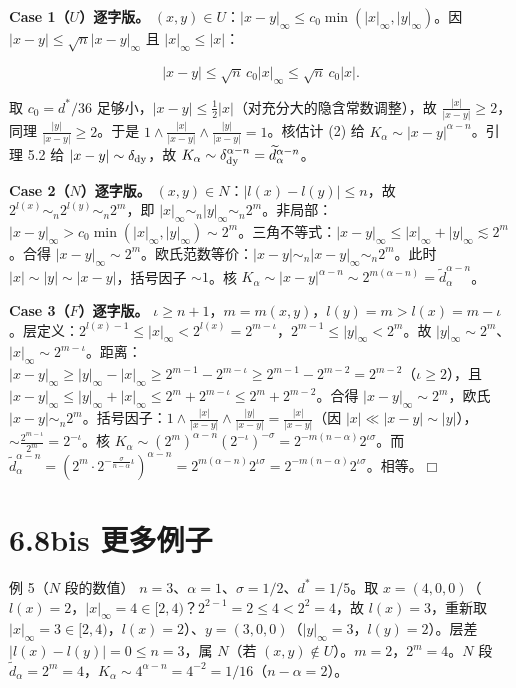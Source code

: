 \documentclass[a4paper,11pt,openany]{ctexbook}
\numberwithin{equation}{chapter}
\numberwithin{figure}{chapter}
\numberwithin{table}{chapter}
\begin{document}
\textbf{Case 1（$U$）逐字版。} $(x,y)\in U$：$|x-y|_\infty\le c_0\min(|x|_\infty,|y|_\infty)$。因 $|x-y|\le\sqrt n|x-y|_\infty$ 且 $|x|_\infty\le|x|$：

$$|x-y|\le\sqrt n\, c_0|x|_\infty\le\sqrt n\, c_0|x|.$$

取 $c_0=d^*/36$ 足够小，$|x-y|\le\frac12|x|$（对充分大的隐含常数调整），故 $\frac{|x|}{|x-y|}\ge2$，同理 $\frac{|y|}{|x-y|}\ge2$。于是 $1\wedge\frac{|x|}{|x-y|}\wedge\frac{|y|}{|x-y|}=1$。核估计 (2) 给 $K_\alpha\sim|x-y|^{\alpha-n}$。引理 5.2 给 $|x-y|\sim\delta_{\rm dy}$，故 $K_\alpha\sim\delta_{\rm dy}^{\alpha-n}=\widetilde d_\alpha^{\alpha-n}$。

\textbf{Case 2（$N$）逐字版。} $(x,y)\in N$：$|l(x)-l(y)|\le n$，故 $2^{l(x)}\sim_n2^{l(y)}\sim_n2^{m}$，即 $|x|_\infty\sim_n|y|_\infty\sim_n2^{m}$。非局部：$|x-y|_\infty>c_0\min(|x|_\infty,|y|_\infty)\sim2^{m}$。三角不等式：$|x-y|_\infty\le|x|_\infty+|y|_\infty\lesssim2^{m}$。合得 $|x-y|_\infty\sim2^{m}$。欧氏范数等价：$|x-y|\sim_n|x-y|_\infty\sim_n2^{m}$。此时 $|x|\sim|y|\sim|x-y|$，括号因子 $\sim1$。核 $K_\alpha\sim|x-y|^{\alpha-n}\sim2^{m(\alpha-n)}=\widetilde d_\alpha^{\alpha-n}$。

\textbf{Case 3（$F$）逐字版。} $\iota\ge n+1$，$m=m(x,y)$，$l(y)=m>l(x)=m-\iota$。层定义：$2^{l(x)-1}\le|x|_\infty<2^{l(x)}=2^{m-\iota}$，$2^{m-1}\le|y|_\infty<2^m$。故 $|y|_\infty\sim2^m$、$|x|_\infty\sim2^{m-\iota}$。距离：$|x-y|_\infty\ge|y|_\infty-|x|_\infty\ge2^{m-1}-2^{m-\iota}\ge2^{m-1}-2^{m-2}=2^{m-2}$（$\iota\ge2$），且 $|x-y|_\infty\le|y|_\infty+|x|_\infty\le2^m+2^{m-\iota}\le2^m+2^{m-2}$。合得 $|x-y|_\infty\sim2^m$，欧氏 $|x-y|\sim_n2^m$。括号因子：$1\wedge\frac{|x|}{|x-y|}\wedge\frac{|y|}{|x-y|}=\frac{|x|}{|x-y|}$（因 $|x|\ll|x-y|\sim|y|$），$\sim\frac{2^{m-\iota}}{2^m}=2^{-\iota}$。核 $K_\alpha\sim(2^m)^{\alpha-n}(2^{-\iota})^{-\sigma}=2^{-m(n-\alpha)}2^{\iota\sigma}$。而 $\widetilde d_\alpha^{\alpha-n}=(2^m\cdot2^{-\frac{\sigma}{n-\alpha}\iota})^{\alpha-n}=2^{m(\alpha-n)}2^{\iota\sigma}=2^{-m(n-\alpha)}2^{\iota\sigma}$。相等。$\Box$

\section{6.8bis 更多例子}

\begin{examplebox}{例 5（$N$ 段的数值）}
$n=3$、$\alpha=1$、$\sigma=1/2$、$d^*=1/5$。取 $x=(4,0,0)$（$l(x)=2$，$|x|_\infty=4\in[2,4)$？$2^{2-1}=2\le4<2^2=4$，故 $l(x)=3$，重新取 $|x|_\infty=3\in[2,4)$，$l(x)=2$）、$y=(3,0,0)$（$|y|_\infty=3$，$l(y)=2$）。层差 $|l(x)-l(y)|=0\le n=3$，属 $N$（若 $(x,y)\notin U$）。$m=2$，$2^m=4$。$N$ 段 $\widetilde d_\alpha=2^m=4$，$K_\alpha\sim4^{\alpha-n}=4^{-2}=1/16$（$n-\alpha=2$）。
\end{examplebox}
\end{document}
